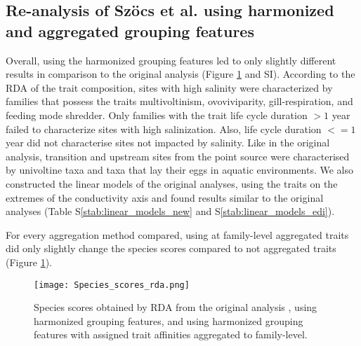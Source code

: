 \documentclass[../Draft_harmonization_paper.tex]{subfiles}
\begin{document}

\subsection*{Re-analysis of Szöcs et al. using harmonized and aggregated grouping features}

Overall, using the harmonized grouping features led to only slightly different results in comparison to the original analysis (Figure \ref{fig:rda_species_scores} and SI). According to the RDA of the trait composition, sites with high salinity were characterized by families that possess the traits multivoltinism, ovoviviparity, gill-respiration, and feeding mode shredder. Only families with the trait life cycle duration $> 1$ year failed to characterize sites with high salinization. Also, life cycle duration $<= 1$ year did not characterise sites not impacted by salinity. Like in the original analysis, transition and upstream sites from the point source were characterised by univoltine taxa and taxa that lay their eggs in aquatic environments. We also constructed the linear models of the original analyses, using the traits on the extremes of the conductivity axis and found results similar to the original analyses (Table S\ref{stab:linear_models_new} and S\ref{stab:linear_models_edi}).

For every aggregation method compared, using at family-level aggregated traits did only slightly change the species scores compared to not aggregated traits (Figure \ref{fig:rda_species_scores}). 

\begin{figure}[H]
    \label{fig:rda_species_scores}
    \centering
    \texttt{[image: Species\_scores\_rda.png]}
    \caption{Species scores obtained by RDA from the original analysis \cite{szocs_effects_2014}, using harmonized grouping features, and using harmonized grouping features with assigned trait affinities aggregated to family-level.}
    \label{fig:rda_species_scores}
\end{figure}
\end{document}
